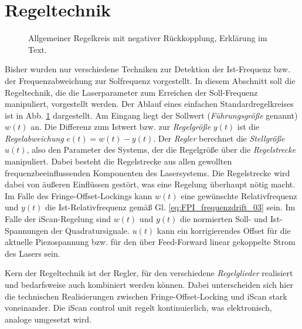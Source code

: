 \section{Regeltechnik}\label{sec:regeltechnik}
\begin{figure}[h]
 	\centering
	\caption[Regelkreis]{Allgemeiner Regelkreis mit negativer
	Rückkopplung, Erklärung im Text.}\label{fig:regelkreis}
\end{figure}
Bisher wurden nur verschiedene Techniken zur Detektion der
Ist-Frequenz bzw. der Frequenzabweichung zur Solfrequenz vorgestellt.
In diesem Abschnitt soll die Regeltechnik, die die Laserparameter zum Erreichen
der Soll-Frequenz manipuliert, vorgestellt werden. Der Ablauf eines
einfachen Standardregelkreises ist in Abb. \ref{fig:regelkreis} dargestellt. Am
Eingang liegt der Sollwert (\textit{Führungsgröße} genannt) $w(t)$ an. Die
Differenz zum Istwert bzw. zur \textit{Regelgröße} $y(t)$ ist die
\textit{Regelabweichung} $e(t)=w(t)-y(t)$. Der \textit{Regler} berechnet die
\textit{Stellgröße} $u(t)$, also den Parameter des Systems, der die Regelgröße
über die \textit{Regelstrecke} manipuliert. Dabei besteht die Regelstrecke aus
allen gewollten frequenzbeeinflussenden Komponenten des Lasersystems. Die
Regelstrecke wird dabei von äußeren Einflüssen gestört, was eine Regelung
überhaupt nötig macht. Im Falle des Fringe-Offset-Lockings kann $w(t)$ eine
gewünschte Relativfrequenz und $y(t)$ die Ist-Relativfrequenz gemäß Gl.
\eqref{eq:FPI_frequenzdrift_03} sein. Im Falle der iScan-Regelung sind $w(t)$
und $y(t)$ die normierten Soll- und Ist-Spannungen der Quadratursignale. $u(t)$
kann ein korrigierendes Offset für die aktuelle Piezospannung bzw. für den über
Feed-Forward linear gekoppelte Strom des Lasers sein.\par
Kern der Regeltechnik ist der Regler, für den verschiedene \textit{Regelglieder}
realisiert und bedarfsweise auch kombiniert werden können.
Dabei unterscheiden sich hier die technischen Realisierungen zwischen
Fringe-Offset-Locking und iScan stark voneinander. Die iScan control unit
regelt kontinuierlich, was elektronisch, analoge umgesetzt wird.
